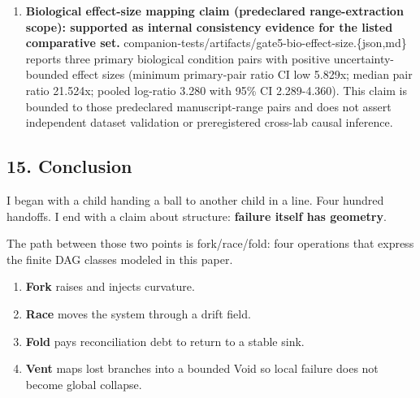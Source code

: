 \documentclass[
]{article}
\providecommand{\tightlist}{%
  \setlength{\itemsep}{0pt}\setlength{\parskip}{0pt}}
\begin{document}
\begin{enumerate}
  companion-tests/artifacts/gate4-rqr-holdout.\{json,md\} reports
  independent train/holdout validation with predeclared scoring
  criteria: Spearman CI low 0.446, slope CI low 0.427, quartile-delta CI
  low 0.100, predictor-correlation CI low 0.176, and decile monotonicity
  violations 1 \textless= 3. This claim is bounded to the tested
  simulator family and does not assert real-world deployment
  predictivity.\\
\item
  \textbf{Biological effect-size mapping claim (predeclared
  range-extraction scope): supported as internal consistency evidence
  for the listed comparative set.}
  companion-tests/artifacts/gate5-bio-effect-size.\{json,md\} reports
  three primary biological condition pairs with positive
  uncertainty-bounded effect sizes (minimum primary-pair ratio CI low
  5.829x; median pair ratio 21.524x; pooled log-ratio 3.280 with 95\% CI
  2.289-4.360). This claim is bounded to those predeclared
  manuscript-range pairs and does not assert independent dataset
  validation or preregistered cross-lab causal inference.
\end{enumerate}

\subsection{\texorpdfstring{\textbf{15.
Conclusion}}{15. Conclusion}}\label{conclusion}

I began with a child handing a ball to another child in a line. Four
hundred handoffs. I end with a claim about structure: \textbf{failure
itself has geometry}.

The path between those two points is fork/race/fold: four operations
that express the finite DAG classes modeled in this paper.

\begin{enumerate}
\def\labelenumi{\arabic{enumi}.}
\tightlist
\item
  \textbf{Fork} raises and injects curvature.\\
\item
  \textbf{Race} moves the system through a drift field.\\
\item
  \textbf{Fold} pays reconciliation debt to return to a stable sink.\\
\item
  \textbf{Vent} maps lost branches into a bounded Void so local failure
  does not become global collapse.
\end{enumerate}
\end{document}
